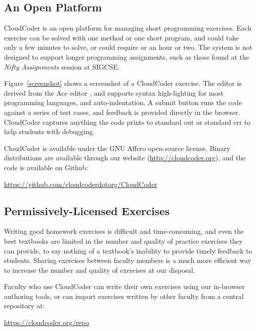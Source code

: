 \documentclass{sig-alternate}
\begin{document}
\subsection{An Open Platform}

CloudCoder is an open platform for managing short programming
exercises.  Each exercise can be solved with one method or one short
program, and could take only a few minutes to solve, or could require
or an hour or two.  The system is not designed to support longer
programming assignments, such as those found at the {\em Nifty
Assignments} session at SIGCSE.

Figure~\ref{screenshot} shows a screenshot of a CloudCoder exercise.
The editor is derived from the Ace editor \cite{ace}, and supports
syntax high-lighting for most programming languages, and
auto-indentation.  
A submit button runs the code against a series of
test cases, and feedback is provided directly in the browser.
CloudCoder captures anything the code prints to standard out or
standard err to help students with debugging.

CloudCoder is available under the GNU Affero open-source license.
Binary distributions are available through our website (\url{http://cloudcoder.org}),
and the code is available on Github:

\vspace*{3mm} 
\url{https://github.com/cloudcoderdotorg/CloudCoder}
\vspace*{3mm}


\subsection{Permissively-Licensed Exercises}

Writing good homework exercises is difficult and
time-consuming, and even the best textbooks are limited in the
number and quality of practice exercises they can provide, to say
nothing of a textbook's inability to provide timely feedback to
students.
Sharing exercises between faculty members is a much
more efficient way to increase the number and quality of exercises at
our disposal.

Faculty who use CloudCoder can write their own exercises using our in-browser
authoring tools, or can import exercises written by other faculty
from a central repository at:

\vspace*{3mm} 
\url{https://cloudcoder.org/repo}
\vspace*{3mm} 
\end{document}
